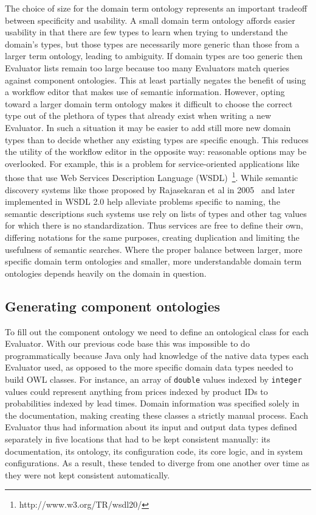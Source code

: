 \documentclass{article}
\begin{document}
The choice of size for the domain term ontology represents an important tradeoff between specificity and usability.
A small domain term ontology affords easier usability in that there are few types to learn when trying to understand the domain's types, but those types are necessarily more generic than those from a larger term ontology, leading to ambiguity.
If domain types are too generic then Evaluator lists remain too large because too many Evaluators match queries against component ontologies.
This at least partially negates the benefit of using a workflow editor that makes use of semantic information.
However, opting toward a larger domain term ontology makes it difficult to choose the correct type out of the plethora of types that already exist when writing a new Evaluator.
In such a situation it may be easier to add still more new domain types than to decide whether any existing types are specific enough.
This reduces the utility of the workflow editor in the opposite way:  reasonable options may be overlooked.
For example, this is a problem for service-oriented applications like those that use Web Services Description Language (WSDL)~\footnote{http://www.w3.org/TR/wsdl20/}.
While semantic discovery systems like those proposed by Rajasekaran et al in 2005~\cite{rajasekaran2005enhancing} and later implemented in WSDL 2.0 help alleviate problems specific to naming, the semantic descriptions such systems use rely on lists of types and other tag values for which there is no standardization.
Thus services are free to define their own, differing notations for the same purposes, creating duplication and limiting the usefulness of semantic searches.
Where the proper balance between larger, more specific domain term ontologies and smaller, more understandable domain term ontologies depends heavily on the domain in question.

\subsection{Generating component ontologies}

To fill out the component ontology we need to define an ontological class for each Evaluator.
With our previous code base this was impossible to do programmatically because Java only had knowledge of the native data types each Evaluator used, as opposed to the more specific domain data types needed to build OWL classes.
For instance, an array of \texttt{double} values indexed by \texttt{integer} values could represent anything from prices indexed by product IDs to probabilities indexed by lead times.
Domain information was specified solely in the documentation, making creating these classes a strictly manual process.
Each Evaluator thus had information about its input and output data types defined separately in five locations that had to be kept consistent manually:  its documentation, its ontology, its configuration code, its core logic, and in system configurations.
As a result, these tended to diverge from one another over time as they were not kept consistent automatically.
\end{document}
